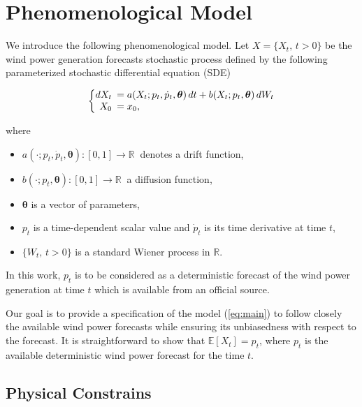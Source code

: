 \documentclass[11pt]{article}
\begin{document}
\section{Phenomenological  Model} \label{Section_2}

We introduce the following phenomenological model. Let $X = \{X_t, \, t>0\}$  be the  wind power generation forecasts stochastic process defined by the following parameterized stochastic differential equation (SDE)

\begin{equation}
  \left\{
  \begin{array}{@{}rl@{}}
    dX_t \!\!\!&=  a(X_t; p_t, \dot{p}_t,\bm{\theta}) \,dt + b (X_t; p_t, \bm{\theta} ) \,dW_t  \\
     X_0  \!\!\!&=  x_0,
  \end{array}\right. \label{eq:main}
\end{equation} 

where

\begin{itemize}
\item $a(\cdot; p_t, \dot{p}_t,\bm{\theta}):[0,1] \to \mathbb{R} \ $  denotes a drift function,
\item $b (\cdot;p_t, \bm{\theta} ):[0,1] \to \mathbb{R} \ $  a  diffusion function,
\item $\bm{\theta}$ is a vector of parameters,
\item $p_t$ is a time-dependent scalar value and $ \dot{p}_t$ is its time derivative at time $t$,
\item $\{W_t, \, t >0\}$ is a standard Wiener process in $\mathbb{R}$.
\end{itemize}

In this work, $p_t$ is to be considered as a deterministic forecast of the wind power generation at time $t$ which is available from an official source. 

Our goal is to provide a specification of the model (\ref{eq:main}) to follow closely the available wind power forecasts while ensuring its unbiasedness with respect to the forecast. It is straightforward to show that $\mathbb{E} \left[X_t\right] = p_t$, where $p_t$ is the available deterministic wind power forecast for the time $t$.

\subsection{Physical Constrains}
\end{document}
